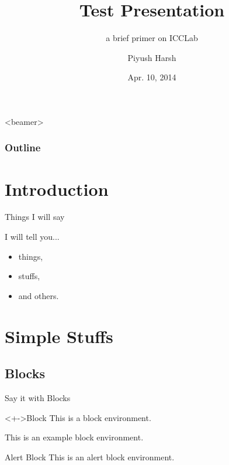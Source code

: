 \documentclass{beamer}
\title[BGP-Primer]
{Test Presentation}
\subtitle
{a brief primer on ICCLab}
\author[Harsh]{Piyush Harsh}
\institute
{
  Institute of Applied Information Technology
}
\date[04.10.2014]
{Apr. 10, 2014}
\begin{document}
\thispagestyle{empty} 

\begin{frame}
 \titlepage
\end{frame}

\begin{frame}<beamer>
  \frametitle{Outline}
  \tableofcontents
\end{frame}

\section{Introduction}


\begin{frame}{Things I will say}

I will tell you...

    \begin{itemize}
    \item things,
    \item stuffs,
    \item and \alert{others}.
    \end{itemize}

\end{frame}

\section{Simple Stuffs}

\subsection{Blocks}

\begin{frame}{Say it with Blocks}

\begin{block}<+->{Block} 
This is a block environment.
\end{block}

\begin{example}
This is an example block environment.
\end{example}

 \begin{alertblock}{Alert Block}
This is an alert block environment.
\end{alertblock}

\end{frame}
\end{document}
